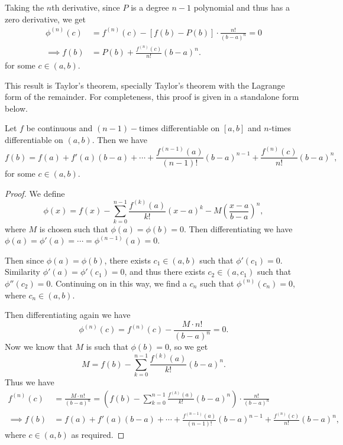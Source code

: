 Taking the $n$th derivative, since $P$ is a degree $n - 1$ polynomial and thus has a zero derivative, we get
\begin{align*}
	\phi^{(n)}(c) &= f^{(n)}(c) - [f(b) - P(b)] \cdot \frac{n!}{(b - a)^n} = 0 \\
\implies f(b)  &= P(b) + \frac{f^{(n)}(c)}{n!}(b - a)^n.
\end{align*}
for some $c \in (a, b)$. 

This result is Taylor's theorem, specially Taylor's theorem with the Lagrange form of the remainder. For completeness, this proof is given in a standalone form below.

\begin{theorem}
	Let $f$ be continuous and $(n - 1)-$times differentiable on $[a, b]$ and $n$-times differentiable on $(a, b)$. Then we have
	$$
	f(b) = f(a) + f'(a)(b - a) + \cdots + \frac{f^{(n - 1)}(a)}{(n - 1)!}(b - a)^{n - 1} + \frac{f^{(n)}(c)}{n!}(b - a)^n,
	$$
	for some $c \in (a, b)$.
\end{theorem}
\begin{proof}
	We define
	$$
	\phi(x) = f(x) - \sum_{k = 0}^{n - 1} \frac{f^{(k)}(a)}{k!}(x - a)^k - M \left(\frac{x - a}{b - a}\right)^n,
	$$
	where $M$ is chosen such that $\phi(a) = \phi(b) = 0$.
	Then differentiating we have $\phi(a) = \phi'(a) = \cdots = \phi^{(n - 1)}(a) = 0$. 

	Then since $\phi(a) = \phi(b)$, there exists $c_1 \in (a, b)$ such that $\phi'(c_1) = 0$. Similarity $\phi'(a) = \phi'(c_1) = 0$, and thus there exists $c_2 \in (a, c_1)$ such that $\phi''(c_2) = 0$. Continuing on in this way, we find a $c_{n}$ such that $\phi^{(n)}(c_n) = 0$, where $c_n \in (a, b)$. 

	Then differentiating again we have
	$$
	\phi^{(n)}(c) = f^{(n)}(c) - \frac{M \cdot n!}{(b - a)^n} = 0.
	$$
	Now we know that $M$ is such that $\phi(b) = 0$, so we get
	$$
	M = f(b) - \sum_{k = 0}^{n - 1}\frac{f^{(k)}(a)}{k!} (b - a)^n.
	$$
	Thus we have
	\begin{align*}
		f^{(n)}(c) &= \frac{M \cdot n!}{(b - a)^n} = \left(f(b) - \sum_{k = 0}^{n - 1}\frac{f^{(k)}(a)}{k!} (b - a)^n\right) \cdot \frac{n!}{(b - a)^n} \\
\implies f(b) &= f(a) + f'(a)(b - a) + \cdots + \frac{f^{(n - 1)}(a)}{(n - 1)!}(b - a)^{n - 1} + \frac{f^{(n)}(c)}{n!}(b - a)^n,
	\end{align*}
	where $c \in (a, b)$ as required.
\end{proof}


